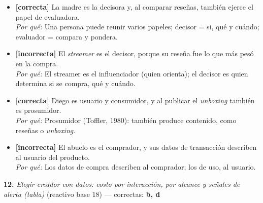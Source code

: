 \documentclass[10pt,letterpaper]{article}
\begin{document}
\begin{itemize}[leftmargin=1.2em,itemsep=0pt,topsep=1pt,parsep=0pt]
\item[\textbf{a)}] {\footnotesize \textbf{[correcta]} La madre es la decisora y, al comparar reseñas, también ejerce el papel de evaluadora.\\ \textit{Por qué:} Una persona puede reunir varios papeles; decisor = si, qué y cuándo; evaluador = compara y pondera.}
\item[\textbf{b)}] {\footnotesize \textbf{[incorrecta]} El \textit{streamer} es el decisor, porque su reseña fue lo que más pesó en la compra.\\ \textit{Por qué:} El streamer es el influenciador (quien orienta); el decisor es quien determina si se compra, qué y cuándo.}
\item[\textbf{c)}] {\footnotesize \textbf{[correcta]} Diego es usuario y consumidor, y al publicar el \textit{unboxing} también es prosumidor.\\ \textit{Por qué:} Prosumidor (Toffler, 1980): también produce contenido, como reseñas o \textit{unboxing}.}
\item[\textbf{d)}] {\footnotesize \textbf{[incorrecta]} El abuelo es el comprador, y sus datos de transacción describen al usuario del producto.\\ \textit{Por qué:} Los datos de compra describen al comprador; los de uso, al usuario.}
\end{itemize}
\vspace{3pt}\noindent\textbf{12.} \textit{Elegir creador con datos: costo por interacción, por alcance y señales de alerta (tabla)} (reactivo base 18) — correctas: \textbf{b, d}\\[-1pt]
\end{document}

